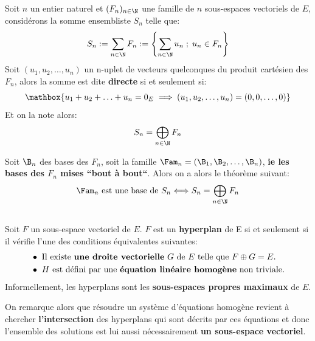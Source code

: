 \subsection*{}
Soit \(n\) un entier naturel et \((F_n)_{n \in \N}\) une famille de \(n\) sous-espaces vectoriels de \(E\), considérons la somme ensembliste \(S_n\) telle que:
\[
    S_n := \sum_{n\in\N} F_n := \Biggl\{ \sum_{n\in\N} u_n \; ; \; u_n \in F_n\Biggl\}
\]
Soit \((u_1, u_2, \ldots, u_n)\) un n-uplet de vecteurs quelconques du produit cartésien des \(F_n\), alors la somme est dite \textbf{directe} si et seulement si:
\[
    \mathbox{
        u_1 + u_2 + \ldots + u_n = 0_E \implies (u_1, u_2, \ldots, u_n) = (0, 0, \ldots, 0)
    }
\]
Et on la note alors:
\[
    S_n = \bigoplus_{n\in\N} F_n
\]

Soit \(\B_n\) des bases des \(F_n\), soit la famille \(\Fam_n = (\B_1, \B_2, \ldots, \B_n)\), \textbf{ie les bases des \(F_n\) mises ``bout à bout``}.\+
Alors on a alors le théorème suivant:
\begin{align*}
        \Fam_n \text{ est une base de } S_n \Longleftrightarrow S_n = \bigoplus_{n\in\N} F_n
\end{align*}
\begin{center}
\end{center}

\subsection*{}
Soit \(F\) un sous-espace vectoriel de \(E\).\+
\(F\) est un \textbf{hyperplan} de E si et seulement si il vérifie l'une des conditions équivalentes suivantes:
\begin{align*}
    &\bullet \text{ Il existe \textbf{une droite vectorielle} \(G\) de \(E\) telle que \(F \oplus G = E\).} \\
    &\bullet \text{ \(H\) est défini par une \textbf{équation linéaire homogène} non triviale.}
\end{align*}
Informellement, les hyperplans sont les \textbf{sous-espaces propres maximaux} de \(E\). \<

On remarque alors que résoudre un système d'équations homogène revient à chercher \textbf{l'intersection} des hyperplans qui sont décrits par ces équations et donc l'ensemble des solutions est lui aussi nécessairement \textbf{un sous-espace vectoriel}.\<